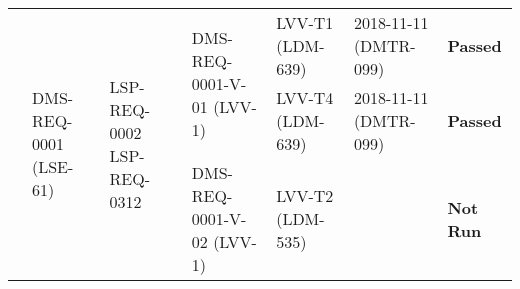 \begin{longtable}[]{|p{1.5cm}|p{2.7cm}|p{1.5cm}|p{3.2cm}|p{1.5cm}|p{1.7cm}|p{1.5cm}|}
\multirow{3}{*}{} &
\multirow{3}{*}{
\begin{minipage}[t]{0.9\columnwidth}
{\small DMS-REQ-0001}\newline
{\scriptsize (LSE-61)}
\end{minipage}} &
\multirow{3}{*}{
\begin{minipage}[t]{0.9\columnwidth}
{\tiny LSP-REQ-0002 \newline LSP-REQ-0312 } 
\end{minipage}} &
\multirow{2}{*}{
\begin{minipage}[t]{0.9\columnwidth}
{\small DMS-REQ-0001-V-01}\newline
{\scriptsize (LVV-1)}
\end{minipage}} &
\begin{minipage}[t]{0.9\columnwidth}
{\small LVV-T1}\newline
{\scriptsize (LDM-639)}
\end{minipage} &
\begin{minipage}[t]{0.9\columnwidth}
{\small 2018-11-11}\newline
{\scriptsize (DMTR-099)}
\end{minipage} &
{\small \bf Passed} \\ \cline{5-7}
 & & & &
\begin{minipage}[t]{0.9\columnwidth}
{\small LVV-T4}\newline
{\scriptsize (LDM-639)}
\end{minipage} &
\begin{minipage}[t]{0.9\columnwidth}
{\small 2018-11-11}\newline
{\scriptsize (DMTR-099)}
\end{minipage} &
{\small \bf Passed} \\\cline{4-7}
 & & &
\multirow{1}{*}{
\begin{minipage}[t]{0.9\columnwidth}
{\small DMS-REQ-0001-V-02}\newline
{\scriptsize (LVV-1)}
\end{minipage} }&
\begin{minipage}[t]{0.9\columnwidth}
{\small LVV-T2}\newline
{\scriptsize (LDM-535)}
\end{minipage} &
 &
{\small \bf Not Run}
\\\hline


\end{longtable}
